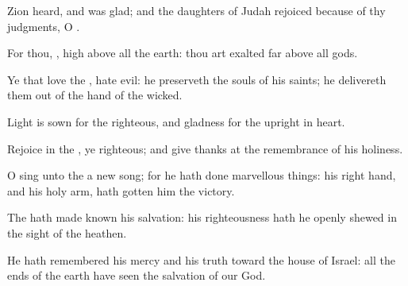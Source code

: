 {\Q {}Zion
heard, and was
glad; and the
daughters of
Judah
rejoiced because of thy
judgments, O
{}.


\par }{\Q {}For thou,
{},
{} high
above all the
earth: thou art
exalted far
above all
gods.


\par }{\Q {}Ye that
love the
{},
hate
evil: he
preserveth the
souls of his
saints; he
delivereth them out of the
hand of the
wicked.


\par }{\Q {}Light is
sown for the
righteous, and
gladness for the
upright in
heart.


\par }{\Q {}Rejoice in the
{}, ye
righteous; and give
thanks at the
remembrance of his
holiness.




\par }
{\Q {}O
sing unto the
{} a
new
song; for he hath
done marvellous
things: his right
hand, and his
holy
arm, hath gotten him the
victory.


\par }{\Q {}The
{} hath made
known his
salvation: his
righteousness hath he openly
shewed in the
sight of the
heathen.


\par }{\Q {}He hath
remembered his
mercy and his
truth toward the
house of
Israel: all the
ends of the
earth have
seen the
salvation of our
God.


\par }{\BB \par }
